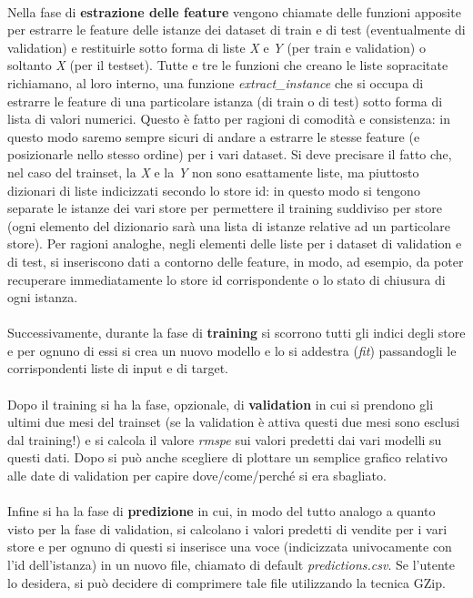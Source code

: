 \\
Nella fase di \textbf{estrazione delle feature} vengono chiamate delle funzioni apposite per estrarre le feature delle istanze dei dataset di train e di test (eventualmente di validation) e restituirle sotto forma di liste \textit{X} e \textit{Y} (per train e validation) o soltanto \textit{X} (per il testset). Tutte e tre le funzioni che creano le liste sopracitate richiamano, al loro interno, una funzione \textit{extract\_instance} che si occupa di estrarre le feature di una particolare istanza (di train o di test) sotto forma di lista di valori numerici. Questo è fatto per ragioni di comodità e consistenza: in questo modo saremo sempre sicuri di andare a estrarre le stesse feature (e posizionarle nello stesso ordine) per i vari dataset. Si deve precisare il fatto che,  nel caso del trainset, la \textit{X} e la \textit{Y} non sono esattamente liste, ma piuttosto dizionari di liste indicizzati secondo lo store id: in questo modo si tengono separate le istanze dei vari store per permettere il training suddiviso per store (ogni elemento del dizionario sarà una lista di istanze relative ad un particolare store). Per ragioni analoghe, negli elementi delle liste per i dataset di validation e di test, si inseriscono dati a contorno delle feature, in modo, ad esempio, da poter recuperare immediatamente lo store id corrispondente o lo stato di chiusura di ogni istanza.\\
\\
Successivamente, durante la fase di \textbf{training} si scorrono tutti gli indici degli store e per ognuno di essi si crea un nuovo modello e lo si addestra (\textit{fit}) passandogli le corrispondenti liste di input e di target.\\
\\
Dopo il training si ha la fase, opzionale, di \textbf{validation} in cui si prendono gli ultimi due mesi del trainset (se la validation è attiva questi due mesi sono esclusi dal training!) e si calcola il valore \textit{rmspe} sui valori predetti dai vari modelli su questi dati. Dopo si può anche scegliere di plottare un semplice grafico relativo alle date di validation per capire dove/come/perché si era sbagliato.\\
\\
Infine si ha la fase di \textbf{predizione} in cui, in modo del tutto analogo a quanto visto per la fase di validation, si calcolano i valori predetti di vendite per i vari store e per ognuno di questi si inserisce una voce (indicizzata univocamente con l'id dell'istanza) in un nuovo file, chiamato di default \textit{predictions.csv}. Se l'utente lo desidera, si può decidere di comprimere tale file utilizzando la tecnica GZip.
